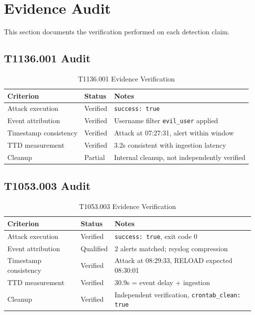 \documentclass[11pt,a4paper]{article}
\begin{document}
\section{Evidence Audit}

This section documents the verification performed on each detection claim.

\subsection{T1136.001 Audit}

\begin{table}[H]
    \centering
    \caption{T1136.001 Evidence Verification}
    \begin{tabular}{lll}
        \toprule
        \textbf{Criterion} & \textbf{Status} & \textbf{Notes} \\
        \midrule
        Attack execution & Verified & \texttt{success: true} \\
        Event attribution & Verified & Username filter \texttt{evil\_user} applied \\
        Timestamp consistency & Verified & Attack at 07:27:31, alert within window \\
        TTD measurement & Verified & 3.2s consistent with ingestion latency \\
        Cleanup & Partial & Internal cleanup, not independently verified \\
        \bottomrule
    \end{tabular}
\end{table}

\subsection{T1053.003 Audit}

\begin{table}[H]
    \centering
    \caption{T1053.003 Evidence Verification}
    \begin{tabular}{lll}
        \toprule
        \textbf{Criterion} & \textbf{Status} & \textbf{Notes} \\
        \midrule
        Attack execution & Verified & \texttt{success: true}, exit code 0 \\
        Event attribution & Qualified & 2 alerts matched; rsyslog compression \\
        Timestamp consistency & Verified & Attack at 08:29:33, RELOAD expected 08:30:01 \\
        TTD measurement & Verified & 30.9s = event delay + ingestion \\
        Cleanup & Verified & Independent verification, \texttt{crontab\_clean: true} \\
        \bottomrule
    \end{tabular}
\end{table}
\end{document}
